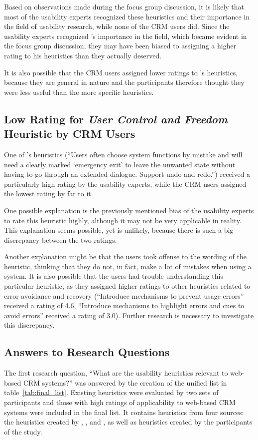 Based on observations made during the focus group discussion, it is likely that most of the usability experts recognized these heuristics and their importance in the field of usability research, while none of the CRM users did. Since the usability experts recognized \citeauthor{Nielsen1994a}'s importance in the field, which became evident in the focus group discussion, they may have been biased to assigning a higher rating to his heuristics than they actually deserved.

It is also possible that the CRM users assigned lower ratings to \citeauthor{Nielsen1994a}'s heuristics, because they are general in nature and the participants therefore thought they were less useful than the more specific heuristics.

\subsection{Low Rating for \textit{User Control and Freedom} Heuristic by CRM Users}
One of \citeauthor{Nielsen1994a}'s heuristics (``Users often choose system functions by mistake and will need a clearly marked `emergency exit' to leave the unwanted state without having to go through an extended dialogue. Support undo and redo.'') received a particularly high rating by the usability experts, while the CRM users assigned the lowest rating by far to it.

One possible explanation is the previously mentioned bias of the usability experts to rate this heuristic highly, although it may not be very applicable in reality. This explanation seems possible, yet is unlikely, because there is such a big discrepancy between the two ratings.

Another explanation might be that the users took offense to the wording of the heuristic, thinking that they do not, in fact, make a lot of mistakes when using a system. It is also possible that the users had trouble understanding this particular heuristic, as they assigned higher ratings to other heuristics related to error avoidance and recovery (``Introduce mechanisms to prevent usage errors'' received a rating of 4.6, ``Introduce mechanisms to highlight errors and cues to avoid errors'' received a rating of 3.0). Further research is necessary to investigate this discrepancy.

\subsection{Answers to Research Questions}
The first research question, ``What are the usability heuristics relevant to web-based CRM systems?'' was answered by the creation of the unified list in table~\ref{tab:final_list}. Existing heuristics were evaluated by two sets of participants and those with high ratings of applicability to web-based CRM systems were included in the final list. It contains heuristics from four sources: the heuristics created by \citet{Nielsen1994a}, \citet{Singh2009}, and \citet{Ardito2006}, as well as heuristics created by the participants of the study.

